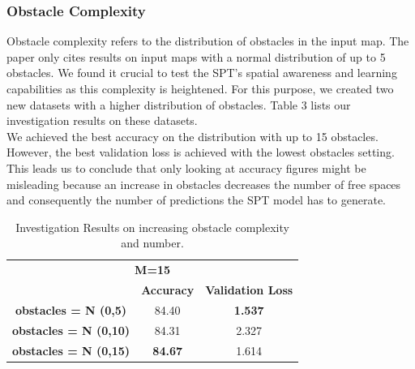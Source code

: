 \subsubsection{Obstacle Complexity}
Obstacle complexity refers to the distribution of obstacles in the input map. The paper only cites results on input maps with a normal distribution of up to 5 obstacles. We found it crucial to test the SPT's spatial awareness and learning capabilities as this complexity is heightened. For this purpose, we created two new datasets with a higher distribution of obstacles. Table 3 lists our investigation results on these datasets.\\ 
We achieved the best accuracy on the distribution with up to 15 obstacles. However, the best validation loss is achieved with the lowest obstacles setting. This leads us to conclude that only looking at accuracy figures might be misleading because an increase in obstacles decreases the number of free spaces and consequently the number of predictions the SPT model has to generate.
\begin{table}[]
\begin{center}
\begin{tabular}{@{}ccc@{}}

\multicolumn{3}{c}{\textbf{M=15}}                                \\
                     & \textbf{Accuracy}       & \textbf{Validation Loss} \\
\textbf{obstacles = N (0,5)}  & 84.40          & \textbf{1.537}  \\
\textbf{obstacles = N (0,10)} & 84.31          & 2.327           \\
\textbf{obstacles = N (0,15)} & \textbf{84.67} & 1.614           \\ 
\end{tabular}
\end{center}
\caption{Investigation Results on increasing obstacle complexity and number.}
\end{table}

